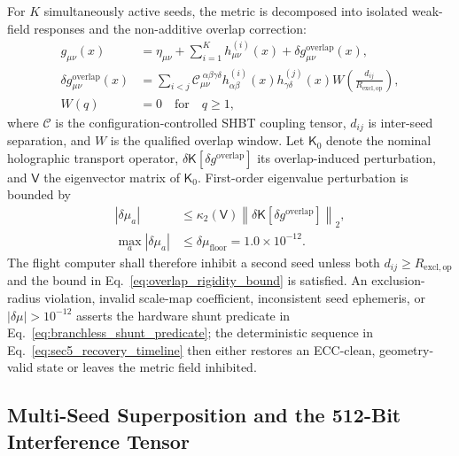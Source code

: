 \documentclass[10pt,twocolumn]{IEEEtran}
\begin{document}
For $K$ simultaneously active seeds, the metric is decomposed into isolated
weak-field responses and the non-additive overlap correction:
\begin{equation}
\begin{aligned}
g_{\mu\nu}(x)
&=\eta_{\mu\nu}+\sum_{i=1}^{K}h_{\mu\nu}^{(i)}(x)
+\delta g_{\mu\nu}^{\mathrm{overlap}}(x), \\
\delta g_{\mu\nu}^{\mathrm{overlap}}(x)
&=\sum_{i<j}
\mathcal C_{\mu\nu}^{\;\alpha\beta\gamma\delta}
h_{\alpha\beta}^{(i)}(x)h_{\gamma\delta}^{(j)}(x)
W\!\left(\frac{d_{ij}}{R_{\mathrm{excl,op}}}\right), \\
W(q)&=0\quad\text{for}\quad q\geq1,
\end{aligned}
\label{eq:overlap_metric}
\end{equation}
where $\mathcal C$ is the configuration-controlled SHBT coupling tensor,
$d_{ij}$ is inter-seed separation, and $W$ is the qualified overlap window.
Let $\mathsf K_0$ denote the nominal holographic transport operator,
$\delta\mathsf K[\delta g^{\mathrm{overlap}}]$ its overlap-induced
perturbation, and $\mathsf V$ the eigenvector matrix of $\mathsf K_0$.
First-order eigenvalue perturbation is bounded by
\begin{equation}
\begin{aligned}
|\delta\mu_a|
&\leq \kappa_2(\mathsf V)
\left\|\delta\mathsf K
[\delta g^{\mathrm{overlap}}]\right\|_2, \\
\max_a|\delta\mu_a|
&\leq\delta\mu_{\mathrm{floor}}=1.0\times10^{-12}.
\end{aligned}
\label{eq:overlap_rigidity_bound}
\end{equation}
The flight computer shall therefore inhibit a second seed unless both
$d_{ij}\geq R_{\mathrm{excl,op}}$ and the bound in
Eq.~\eqref{eq:overlap_rigidity_bound} is satisfied.  An exclusion-radius
violation, invalid scale-map coefficient, inconsistent seed ephemeris, or
$|\delta\mu|>10^{-12}$ asserts the hardware shunt predicate in
Eq.~\eqref{eq:branchless_shunt_predicate}; the deterministic sequence in
Eq.~\eqref{eq:sec5_recovery_timeline} then either restores an ECC-clean,
geometry-valid state or leaves the metric field inhibited.

\subsection{Multi-Seed Superposition and the 512-Bit Interference Tensor}
\end{document}
